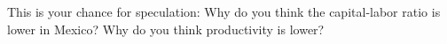 This is your chance for speculation:
Why do you think the capital-labor ratio is lower in Mexico?
Why do you think productivity is lower?


%
%
